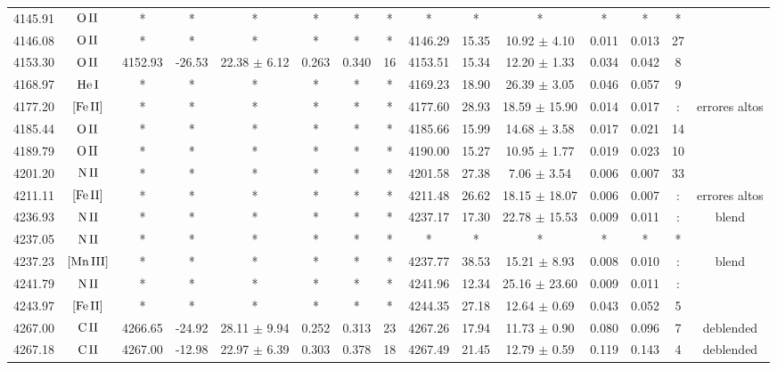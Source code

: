 \documentclass{article}
\begin{document}
\begin{table*}
\begin{adjustbox}{width=\textwidth}
\begin{tabular}{ccccccccccccccc}
4145.91 & $\mbox{O}\thinspace \mbox{II}$ & * & * & * & * & * & * & * & * & * & * & * & * &  \\
4146.08 & $\mbox{O}\thinspace \mbox{II}$ & * & * & * & * & * & * & 4146.29 & 15.35 & 10.92 $\pm$ 4.10 & 0.011 & 0.013 & 27 &  \\
4153.30 & $\mbox{O}\thinspace \mbox{II}$ & 4152.93 & -26.53 & 22.38 $\pm$ 6.12 & 0.263 & 0.340 & 16 & 4153.51 & 15.34 & 12.20 $\pm$ 1.33 & 0.034 & 0.042 & 8 &  \\
4168.97 & $\mbox{He}\thinspace \mbox{I}$ & * & * & * & * & * & * & 4169.23 & 18.90 & 26.39 $\pm$ 3.05 & 0.046 & 0.057 & 9 &  \\
4177.20 & $\mbox{[Fe}\thinspace \mbox{II]}$ & * & * & * & * & * & * & 4177.60 & 28.93 & 18.59 $\pm$ 15.90 & 0.014 & 0.017 & : &  errores altos \\
4185.44 & $\mbox{O}\thinspace \mbox{II}$ & * & * & * & * & * & * & 4185.66 & 15.99 & 14.68 $\pm$ 3.58 & 0.017 & 0.021 & 14 &  \\
4189.79 & $\mbox{O}\thinspace \mbox{II}$ & * & * & * & * & * & * & 4190.00 & 15.27 & 10.95 $\pm$ 1.77 & 0.019 & 0.023 & 10 &  \\
4201.20 & $\mbox{N}\thinspace \mbox{II}$ & * & * & * & * & * & * & 4201.58 & 27.38 & 7.06 $\pm$ 3.54 & 0.006 & 0.007 & 33 &  \\
4211.11 & $\mbox{[Fe}\thinspace \mbox{II]}$ & * & * & * & * & * & * & 4211.48 & 26.62 & 18.15 $\pm$ 18.07 & 0.006 & 0.007 & : &  errores altos \\
4236.93 & $\mbox{N}\thinspace \mbox{II}$ & * & * & * & * & * & * & 4237.17 & 17.30 & 22.78 $\pm$ 15.53 & 0.009 & 0.011 & : &  blend \\
4237.05 & $\mbox{N}\thinspace \mbox{II}$ & * & * & * & * & * & * & * & * & * & * & * & * &  \\
4237.23 & $\mbox{[Mn}\thinspace \mbox{III]}$ & * & * & * & * & * & * & 4237.77 & 38.53 & 15.21 $\pm$ 8.93 & 0.008 & 0.010 & : &  blend \\
4241.79 & $\mbox{N}\thinspace \mbox{II}$ & * & * & * & * & * & * & 4241.96 & 12.34 & 25.16 $\pm$ 23.60 & 0.009 & 0.011 & : &  \\
4243.97 & $\mbox{[Fe}\thinspace \mbox{II]}$ & * & * & * & * & * & * & 4244.35 & 27.18 & 12.64 $\pm$ 0.69 & 0.043 & 0.052 & 5 &  \\
4267.00 & $\mbox{C}\thinspace \mbox{II}$ & 4266.65 & -24.92 & 28.11 $\pm$ 9.94 & 0.252 & 0.313 & 23 & 4267.26 & 17.94 & 11.73 $\pm$ 0.90 & 0.080 & 0.096 & 7 &  deblended \\
4267.18 & $\mbox{C}\thinspace \mbox{II}$ & 4267.00 & -12.98 & 22.97 $\pm$ 6.39 & 0.303 & 0.378 & 18 & 4267.49 & 21.45 & 12.79 $\pm$ 0.59 & 0.119 & 0.143 & 4 &  deblended \\

\end{tabular}
\end{adjustbox}
\end{table*}
\end{document}
